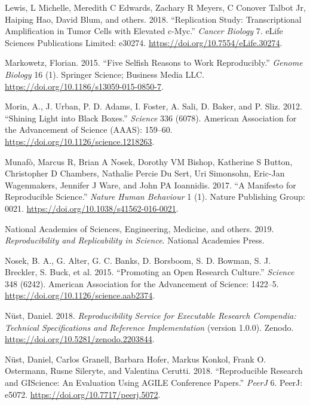 \documentclass[onecolumn]{article}
\begin{document}
\leavevmode\hypertarget{ref-lewis2018replication}{}%
Lewis, L Michelle, Meredith C Edwards, Zachary R Meyers, C Conover
Talbot Jr, Haiping Hao, David Blum, and others. 2018. ``Replication
Study: Transcriptional Amplification in Tumor Cells with Elevated
c-Myc.'' \emph{Cancer Biology} 7. eLife Sciences Publications Limited:
e30274. \url{https://doi.org/10.7554/eLife.30274}.

\leavevmode\hypertarget{ref-markowetz2015five}{}%
Markowetz, Florian. 2015. ``Five Selfish Reasons to Work Reproducibly.''
\emph{Genome Biology} 16 (1). Springer Science; Business Media LLC.
\url{https://doi.org/10.1186/s13059-015-0850-7}.

\leavevmode\hypertarget{ref-morin2012shining}{}%
Morin, A., J. Urban, P. D. Adams, I. Foster, A. Sali, D. Baker, and P.
Sliz. 2012. ``Shining Light into Black Boxes.'' \emph{Science} 336
(6078). American Association for the Advancement of Science (AAAS):
159--60. \url{https://doi.org/10.1126/science.1218263}.

\leavevmode\hypertarget{ref-munafo2017manifesto}{}%
Munafò, Marcus R, Brian A Nosek, Dorothy VM Bishop, Katherine S Button,
Christopher D Chambers, Nathalie Percie Du Sert, Uri Simonsohn, Eric-Jan
Wagenmakers, Jennifer J Ware, and John PA Ioannidis. 2017. ``A Manifesto
for Reproducible Science.'' \emph{Nature Human Behaviour} 1 (1). Nature
Publishing Group: 0021. \url{https://doi.org/10.1038/s41562-016-0021}.

\leavevmode\hypertarget{ref-national2019reproducibility}{}%
National Academies of Sciences, Engineering, Medicine, and others. 2019.
\emph{Reproducibility and Replicability in Science}. National Academies
Press.

\leavevmode\hypertarget{ref-Nosek1422}{}%
Nosek, B. A., G. Alter, G. C. Banks, D. Borsboom, S. D. Bowman, S. J.
Breckler, S. Buck, et al. 2015. ``Promoting an Open Research Culture.''
\emph{Science} 348 (6242). American Association for the Advancement of
Science: 1422--5. \url{https://doi.org/10.1126/science.aab2374}.

\leavevmode\hypertarget{ref-nust_daniel2018}{}%
Nüst, Daniel. 2018. \emph{Reproducibility Service for Executable
Research Compendia: Technical Specifications and Reference
Implementation} (version 1.0.0). Zenodo.
\url{https://doi.org/10.5281/zenodo.2203844}.

\leavevmode\hypertarget{ref-nust2018reproducible}{}%
Nüst, Daniel, Carlos Granell, Barbara Hofer, Markus Konkol, Frank O.
Ostermann, Rusne Sileryte, and Valentina Cerutti. 2018. ``Reproducible
Research and GIScience: An Evaluation Using AGILE Conference Papers.''
\emph{PeerJ} 6. PeerJ: e5072. \url{https://doi.org/10.7717/peerj.5072}.
\end{document}
